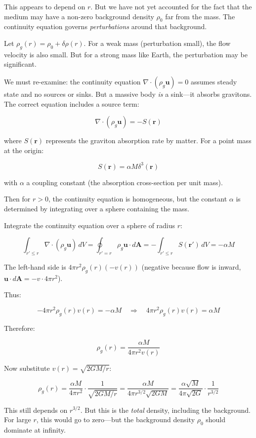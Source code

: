 \documentclass[12pt, a4paper]{article}
\begin{document}
This appears to depend on \( r \). But we have not yet accounted for the fact that the medium may have a non-zero background density \( \rho_0 \) far from the mass. The continuity equation governs \textit{perturbations} around that background.

Let \( \rho_g(r) = \rho_0 + \delta \rho(r) \). For a weak mass (perturbation small), the flow velocity is also small. But for a strong mass like Earth, the perturbation may be significant.

We must re-examine: the continuity equation \( \nabla \cdot (\rho_g \mathbf{u}) = 0 \) assumes steady state and no sources or sinks. But a massive body \textit{is} a sink—it absorbs gravitons. The correct equation includes a source term:

\[
\nabla \cdot (\rho_g \mathbf{u}) = -S(\mathbf{r})
\]

where \( S(\mathbf{r}) \) represents the graviton absorption rate by matter. For a point mass at the origin:

\[
S(\mathbf{r}) = \alpha M \delta^3(\mathbf{r})
\]

with \( \alpha \) a coupling constant (the absorption cross-section per unit mass).

Then for \( r > 0 \), the continuity equation is homogeneous, but the constant \( \alpha \) is determined by integrating over a sphere containing the mass.

Integrate the continuity equation over a sphere of radius \( r \):

\[
\int_{r' \leq r} \nabla \cdot (\rho_g \mathbf{u}) \, dV = \oint_{r' = r} \rho_g \mathbf{u} \cdot d\mathbf{A} = -\int_{r' \leq r} S(\mathbf{r'}) \, dV = -\alpha M
\]

The left-hand side is \( 4\pi r^2 \rho_g(r) (-v(r)) \) (negative because flow is inward, \( \mathbf{u} \cdot d\mathbf{A} = -v \cdot 4\pi r^2 \)).

Thus:

\[
-4\pi r^2 \rho_g(r) v(r) = -\alpha M \quad \Rightarrow \quad 4\pi r^2 \rho_g(r) v(r) = \alpha M
\]

Therefore:

\[
\rho_g(r) = \frac{\alpha M}{4\pi r^2 v(r)}
\]

Now substitute \( v(r) = \sqrt{2GM/r} \):

\[
\rho_g(r) = \frac{\alpha M}{4\pi r^2} \cdot \frac{1}{\sqrt{2GM/r}} = \frac{\alpha M}{4\pi r^{3/2} \sqrt{2GM}} = \frac{\alpha \sqrt{M}}{4\pi \sqrt{2G}} \cdot \frac{1}{r^{3/2}}
\]

This still depends on \( r^{3/2} \). But this is the \textit{total} density, including the background. For large \( r \), this would go to zero—but the background density \( \rho_0 \) should dominate at infinity.
\end{document}

